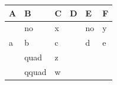 \documentclass{article}
\begin{document}
\begin{tabular}{lll|lll}
A& B& C & D& E& F\\
\hline
& no& x& & no & y\\
a& b& c&
  & d& e\\
& quad& z\\
& qquad& w
\end{tabular}
\end{document}
